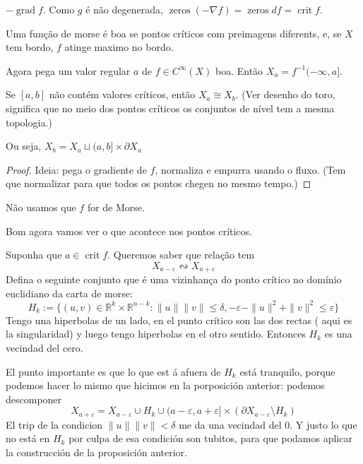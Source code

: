 \begin{example}\leavevmode
\(-\operatorname{gr a d} f\). Como \(g\) é não degenerada, \(\operatorname{ z e r o s}(-\nabla f)=\operatorname{ z e r o s}df=\operatorname{crit}f\).
\end{example}

Uma função de morse é boa  se pontos críticos com preimagens diferents, e, se \(X\) tem bordo, \(f\) atinge maximo no bordo.

Agora pega um valor regular \(a\) de \(f \in C^\infty(X)\) boa. Então \(X_a=f^{-1}(-\infty,a]\).


\begin{prop}\leavevmode
	Se \([a,b]\) não contém valores críticos, então  \(X_a \cong X_b\). (Ver desenho do toro, significa que no meio dos pontos críticos os conjuntos de nível tem a mesma topologia.)

	Ou seja, \(X_b= X_a \sqcup (a,b] \times \partial X_a\)
\end{prop}

\begin{proof}\leavevmode
Ideia: pega o gradiente de \(f\), normaliza e empurra usando o fluxo. (Tem que normalizar para que todos os pontos chegen no mesmo tempo.)
\end{proof}

\begin{remark}\leavevmode
Não usamos que \(f\) for de Morse.
\end{remark}

Bom agora vamos ver o que acontece nos pontos críticos.

Suponha que \(a \in \operatorname{crit} f\). Queremos saber que relação tem
\[X_{a-\varepsilon} \leftrightsquigarrow X_{a+\varepsilon}\]
Defina o seguinte conjunto que é uma vizinhança do ponto crítico no domínio euclidiano da carta de morse:
\[H_k:=\{(u,v) \in \mathbb{R}^k \times \mathbb{R}^{ n-k}: \|u\|\|v\|\leq  \delta, -\varepsilon -\|u\|^2 + \|v\|^2 \leq  \varepsilon\}\]
Tengo una hiperbolas de un lado, en el punto crítico son las dos rectas ( aqui es la singularidad) y luego tengo hiperbolas en el otro sentido. Entonces \(H_k\) es una vecindad del cero.

El punto importante es que lo que est á afuera de \(H_k\) está tranquilo, porque podemos hacer lo mismo que hicimos en la porposición anterior: podemos descomponer
\[X_{a+ \varepsilon}= X_{a- \varepsilon} \cup  H_k \cup  (a - \varepsilon, a+\varepsilon]\times(\partial X_{a-\varepsilon}\setminus H_k)\]
El trip de la condicion \(\|u\|\|v\|<\delta\) me da una vecindad del 0. Y justo lo que no está en \(H_k\) por culpa de esa condición son tubitos, para que podamos aplicar la construcción de la proposición anterior.

